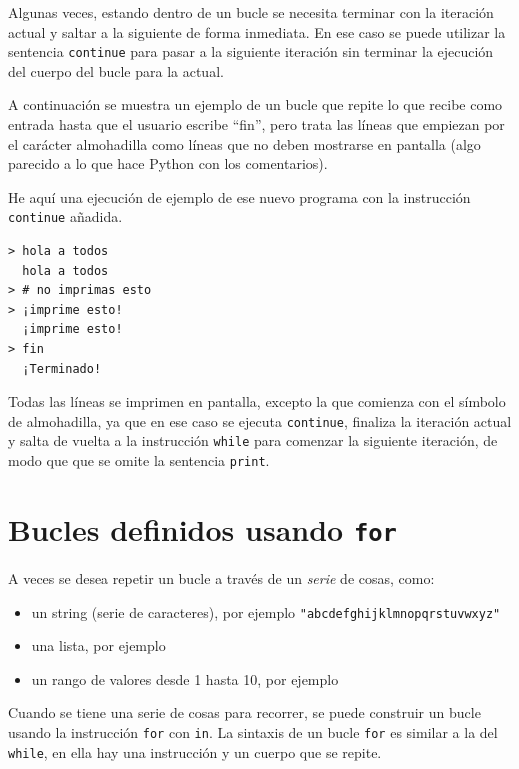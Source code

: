  

Algunas veces, estando dentro de un bucle se necesita terminar con la
iteración actual y saltar a la siguiente de forma inmediata. En ese caso
se puede utilizar la sentencia \texttt{continue} para pasar a la
siguiente iteración sin terminar la ejecución del cuerpo del bucle para
la actual.

A continuación se muestra un ejemplo de un bucle que repite lo que
recibe como entrada hasta que el usuario escribe ``fin'', pero trata las
líneas que empiezan por el carácter almohadilla como líneas que no deben
mostrarse en pantalla (algo parecido a lo que hace Python con los
comentarios).


He aquí una ejecución de ejemplo de ese nuevo programa con la instrucción
\texttt{continue} añadida.

\begin{Verbatim}[frame=single]
> hola a todos
  hola a todos
> # no imprimas esto
> ¡imprime esto!
  ¡imprime esto!
> fin
  ¡Terminado!
\end{Verbatim}

Todas las líneas se imprimen en pantalla, excepto la que comienza con el
símbolo de almohadilla, ya que en ese caso se ejecuta \texttt{continue},
finaliza la iteración actual y salta de vuelta a la instrucción
\texttt{while} para comenzar la siguiente iteración, de modo que que se
omite la sentencia \texttt{print}.







\hypertarget{bucles-definidos-usando-for}{%
\section{\texorpdfstring{Bucles definidos usando
\texttt{for}}{Bucles definidos usando for}}\label{bucles-definidos-usando-for}}

 

A veces se desea repetir un bucle a través de un \emph{serie} de cosas, como:

\begin{itemize}[nosep]
    \item un string (serie de caracteres), por ejemplo \verb|"abcdefghijklmnopqrstuvwxyz"|
    \item una lista, por ejemplo 
    \item un rango de valores desde 1 hasta 10, por ejemplo  
\end{itemize}
Cuando se tiene una serie de cosas para recorrer, se puede
construir un bucle usando la instrucción \texttt{for} con \texttt{in}. 
La sintaxis de un bucle \texttt{for} es similar a la del
\texttt{while}, en ella hay una instrucción  y un cuerpo que se repite.



